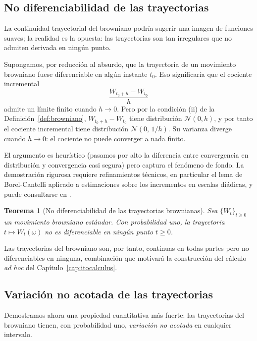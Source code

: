 \documentclass[11pt,a4paper,oneside]{report}
\theoremstyle{plain}
\newtheorem{teorema}{Teorema}[chapter]
\theoremstyle{definition}
\theoremstyle{remark}
\newcommand{\1}{\mathbf{1}}
\begin{document}
\subsection{No diferenciabilidad de las trayectorias}
\label{subsec:no_diferenciabilidad}

La continuidad trayectorial del browniano podría sugerir una imagen
de funciones suaves; la realidad es la opuesta: las trayectorias
son tan irregulares que no admiten derivada en ningún punto.

Supongamos, por reducción al absurdo, que la trayectoria de un
movimiento browniano fuese diferenciable en algún instante $t_0$. Eso
significaría que el cociente incremental
\begin{equation*}
  \frac{W_{t_0 + h} - W_{t_0}}{h}
\end{equation*}
admite un límite finito cuando $h \to 0$. Pero por la condición (ii) de
la Definición~\ref{def:browniano}, $W_{t_0+h} - W_{t_0}$ tiene
distribución $\mathcal{N}(0, h)$, y por tanto el cociente incremental
tiene distribución $\mathcal{N}(0,\, 1/h)$. Su varianza diverge cuando
$h \to 0$: el cociente no puede converger a nada finito.

El argumento es heurístico (pasamos por alto la diferencia entre
convergencia en distribución y convergencia casi segura) pero captura
el fenómeno de fondo. La demostración rigurosa requiere refinamientos
técnicos, en particular el lema de Borel-Cantelli aplicado a estimaciones
sobre los incrementos en escalas diádicas, y puede consultarse en
\cite{karatzas-shreve}.

\begin{teorema}[No diferenciabilidad de las trayectorias brownianas]
\label{teo:no_diferenciabilidad}
Sea $\{W_t\}_{t \geq 0}$ un movimiento browniano estándar. Con
probabilidad uno, la trayectoria $t \mapsto W_t(\omega)$ no es
diferenciable en ningún punto $t \geq 0$.
\end{teorema}

Las trayectorias del browniano son, por tanto, continuas en todas partes
pero no diferenciables en ninguna, combinación que motivará la
construcción del cálculo \emph{ad hoc} del
Capítulo~\ref{cap:itocalculus}.

\subsection{Variación no acotada de las trayectorias}
\label{subsec:variacion_no_acotada}

Demostramos ahora una propiedad cuantitativa más fuerte:
las trayectorias del browniano tienen, con probabilidad uno,
\emph{variación no acotada} en cualquier intervalo.
\end{document}
